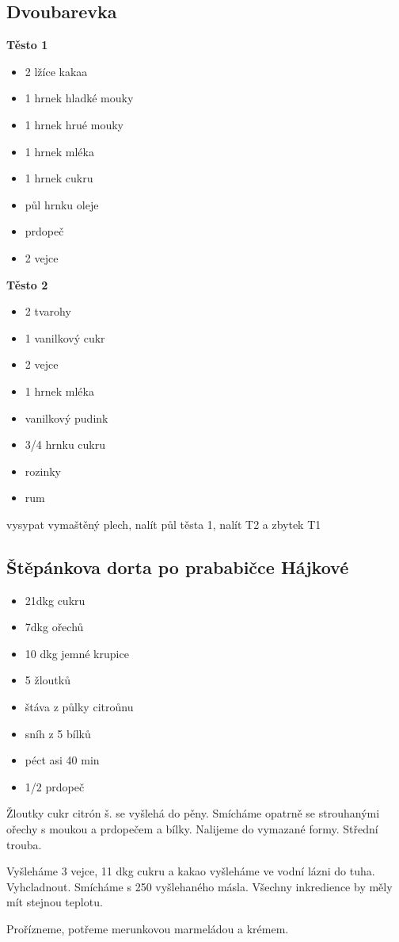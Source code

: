 \documentclass[10pt,a4paper]{article}
\newenvironment{myitemize}
{ \begin{itemize}
    \setlength{\itemsep}{0pt}
    \setlength{\parskip}{0pt}
    \setlength{\parsep}{0pt}     }
{ \end{itemize}                  }
\begin{document}
\subsection{Dvoubarevka}
\begin{minipage}[t]{0,5\textwidth}
\textbf{Těsto 1}
\begin{myitemize} 
\item 2 lžíce kakaa
\item 1 hrnek hladké mouky
\item 1 hrnek hrué mouky
\item 1 hrnek mléka
\item 1 hrnek cukru
\item půl hrnku oleje
\item prdopeč
\item 2 vejce
\end{myitemize}
\end{minipage}
\begin{minipage}[t]{0,5\textwidth}
\textbf{Těsto 2}
\begin{myitemize} 
\item 2 tvarohy
\item 1 vanilkový cukr
\item 2 vejce
\item 1 hrnek mléka
\item vanilkový pudink
\item 3/4 hrnku cukru
\item rozinky
\item rum
\end{myitemize}
vysypat vymaštěný plech, nalít půl těsta 1, nalít T2 a zbytek T1
\end{minipage}
\subsection{Štěpánkova dorta po prababičce Hájkové}
\begin{minipage}[t]{0,5\textwidth}
\begin{myitemize} 
\item 21dkg cukru
\item 7dkg ořechů
\item 10 dkg jemné krupice 
\item 5 žloutků
\item štáva z půlky citroůnu
\item sníh z 5 bílků
\item péct asi 40 min
\item 1/2 prdopeč
\end{myitemize}
\end{minipage}
\begin{minipage}[t]{0,5\textwidth}
Žloutky cukr citrón š. se vyšlehá do pěny. Smícháme opatrně se strouhanými ořechy s moukou a prdopečem a bílky. Nalijeme do vymazané formy. Střední trouba.

Vyšleháme 3 vejce, 11 dkg cukru a kakao vyšleháme ve vodní lázni do tuha. Vyhcladnout. Smícháme s 250 vyšlehaného másla. Všechny inkredience by měly mít stejnou teplotu.

Prořízneme, potřeme merunkovou marmeládou a krémem.
\end{minipage}
\end{document}
